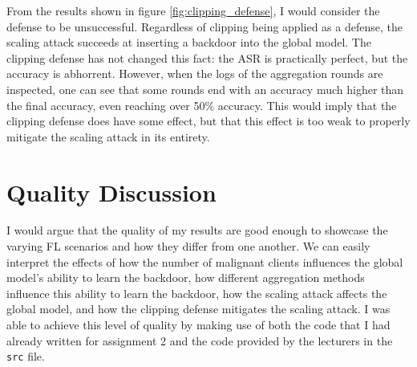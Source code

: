 \documentclass{article}
\begin{document}
From the results shown in figure \ref{fig:clipping_defense}, I would consider the defense to be unsuccessful.
Regardless of clipping being applied as a defense, the scaling attack succeeds at inserting a backdoor into the global model.
The clipping defense has not changed this fact: the ASR is practically perfect, but the accuracy is abhorrent.
However, when the logs of the aggregation rounds are inspected, one can see that some rounds end with an accuracy much higher than the final accuracy, even reaching over 50\% accuracy.
This would imply that the clipping defense does have some effect, but that this effect is too weak to properly mitigate the scaling attack in its entirety.

\section{Quality Discussion}
I would argue that the quality of my results are good enough to showcase the varying FL scenarios and how they differ from one another.
We can easily interpret the effects of how the number of malignant clients influences the global model's ability to learn the backdoor, how different aggregation methods influence this ability to learn the backdoor, how the scaling attack affects the global model, and how the clipping defense mitigates the scaling attack.
I was able to achieve this level of quality by making use of both the code that I had already written for assignment 2 and the code provided by the lecturers in the \texttt{src} file.
\end{document}
